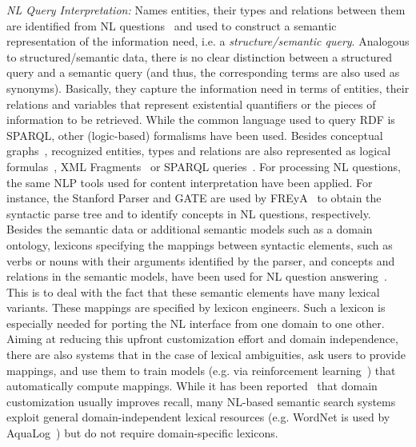 	\emph{NL Query Interpretation:} Names entities, their types and relations between them are identified from NL questions~\cite{DBLP:conf/aswc/CaoCT08} and used to construct a semantic representation of the information need, i.e. a \emph{structure/semantic query}. Analogous to structured/semantic data, there is no clear distinction between a structured query and a semantic query (and thus, the corresponding terms are also used as synonyms). Basically, they capture the information need in terms of entities, their relations and variables that represent existential quantifiers or the pieces of information to be retrieved. While the common language used to query RDF is SPARQL, other (logic-based) formalisms have been used. Besides conceptual graphs~\cite{DBLP:conf/aswc/CaoCT08}, recognized entities, types and relations are also represented as logical formulas~\cite{DBLP:journals/dke/CimianoHHMS08}, XML Fragments~\cite{DBLP:conf/sigir/Chu-CarrollPCFD06} or SPARQL queries~\cite{DBLP:conf/esws/DamljanovicAC10}. For processing NL questions, the same NLP tools used for content interpretation have been applied. For instance, the Stanford Parser and GATE are used by FREyA~\cite{DBLP:conf/esws/DamljanovicAC10} to obtain the syntactic parse tree and to identify concepts in NL questions, respectively. Besides the semantic data or additional semantic models such as a domain ontology, lexicons specifying the mappings between syntactic elements,
such as verbs or nouns with their arguments identified by the parser, and concepts and relations in the semantic models, have been used for NL question answering~\cite{DBLP:journals/dke/CimianoHHMS08}. This is to deal with the fact that these semantic elements have many lexical variants. These mappings are specified by lexicon engineers. Such a lexicon is especially needed for porting the NL interface from one domain to one other. Aiming at reducing this upfront customization effort and domain independence, there are also systems that in the case of lexical ambiguities, ask users to provide mappings, and use them to train models (e.g. via reinforcement learning~\cite{DBLP:conf/esws/DamljanovicAC10}) that automatically compute mappings. While it has been reported~\cite{DBLP:journals/ws/LopezUMP07} that domain customization usually improves recall, many NL-based semantic search systems exploit general domain-independent lexical resources (e.g. WordNet is used by AquaLog~\cite{DBLP:journals/ws/LopezUMP07}) but do not require domain-specific lexicons.

	
	
